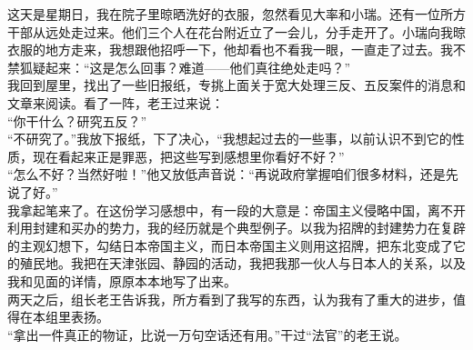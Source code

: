 这天是星期日，我在院子里晾晒洗好的衣服，忽然看见大率和小瑞。还有一位所方干部从远处走过来。他们三个人在花台附近立了一会儿，分手走开了。小瑞向我晾衣服的地方走来，我想跟他招呼一下，他却看也不看我一眼，一直走了过去。我不禁狐疑起来：“这是怎么回事？难道——他们真往绝处走吗？”\\

我回到屋里，找出了一些旧报纸，专挑上面关于宽大处理三反、五反案件的消息和文章来阅读。看了一阵，老王过来说：\\

“你干什么？研究五反？”\\

“不研究了。”我放下报纸，下了决心，“我想起过去的一些事，以前认识不到它的性质，现在看起来正是罪恶，把这些写到感想里你看好不好？”\\

“怎么不好？当然好啦！”他又放低声音说：“再说政府掌握咱们很多材料，还是先说了好。”\\

我拿起笔来了。在这份学习感想中，有一段的大意是：帝国主义侵略中国，离不开利用封建和买办的势力，我的经历就是个典型例子。以我为招牌的封建势力在复辟的主观幻想下，勾结日本帝国主义，而日本帝国主义则用这招牌，把东北变成了它的殖民地。我把在天津张园、静园的活动，我把我那一伙人与日本人的关系，以及我和见面的详情，原原本本地写了出来。\\

两天之后，组长老王告诉我，所方看到了我写的东西，认为我有了重大的进步，值得在本组里表扬。\\

“拿出一件真正的物证，比说一万句空话还有用。”干过“法官”的老王说。